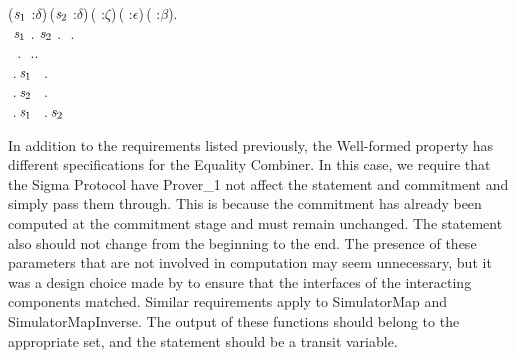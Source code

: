 \begin{holmath}
\HOLSymConst{\HOLTokenForall{}}(\ensuremath{\HOLBoundVar{s}\sb{\mathrm{1}}} :\ensuremath{\delta})\,(\ensuremath{\HOLBoundVar{s}\sb{\mathrm{2}}} :\ensuremath{\delta})\,( :\ensuremath{\zeta})\,( :\ensuremath{\epsilon})\,( :\ensuremath{\beta}).\\
\,\,\ensuremath{\HOLBoundVar{s}\sb{\mathrm{1}}}\,\HOLSymConst{\HOLTokenIn{}}\,.\,\HOLSymConst{\HOLTokenConj{}}\,\ensuremath{\HOLBoundVar{s}\sb{\mathrm{2}}}\,\HOLSymConst{\HOLTokenIn{}}\,.\,\HOLSymConst{\HOLTokenConj{}}\,\,\HOLSymConst{\HOLTokenIn{}}\,.\,\HOLSymConst{\HOLTokenConj{}}\\
\,\,\,\HOLSymConst{\HOLTokenIn{}}\,.\,\HOLSymConst{\HOLTokenConj{}}\,\,\HOLSymConst{\HOLTokenIn{}}\,..\,\HOLSymConst{\HOLTokenImp{}}\\
\,\,.\,\ensuremath{\HOLBoundVar{s}\sb{\mathrm{1}}}\,\,\,\,\HOLSymConst{\HOLTokenIn{}}\,.\,\HOLSymConst{\HOLTokenConj{}}\\
\,\,.\,\ensuremath{\HOLBoundVar{s}\sb{\mathrm{2}}}\,\,\,\,\HOLSymConst{\HOLTokenIn{}}\,.\,\HOLSymConst{\HOLTokenConj{}}\\
\,\,.\,\ensuremath{\HOLBoundVar{s}\sb{\mathrm{1}}}\,\,\,\,\HOLSymConst{=}\,.\,\ensuremath{\HOLBoundVar{s}\sb{\mathrm{2}}}\,\,\,
\end{holmath} 

In addition to the requirements listed previously, the Well-formed property has different specifications for the Equality Combiner. In this case, we require that the Sigma Protocol have Prover_1 not affect the statement and commitment and simply pass them through. This is because the commitment has already been computed at the commitment stage and must remain unchanged. The statement also should not change from the beginning to the end. The presence of these parameters that are not involved in computation may seem unnecessary, but it was a design choice made by \cite{Haines2019VerifiedVF} to ensure that the interfaces of the interacting components matched.
Similar requirements apply to SimulatorMap and SimulatorMapInverse. The output of these functions should belong to the appropriate set, and the statement should be a transit variable.
\newpage
